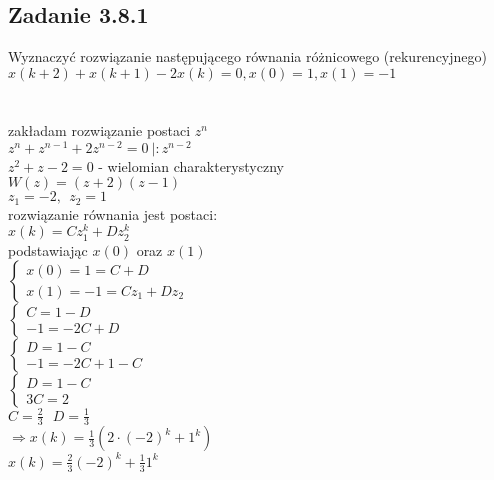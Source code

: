 \subsection*{Zadanie 3.8.1} {\color{darkgray}
	Wyznaczyć rozwiązanie następującego równania różnicowego (rekurencyjnego)\\
	$x(k+2)+x(k+1)-2x(k)=0, x(0)=1,x(1)=-1$\\
}\lineh
\\\\
zakładam rozwiązanie postaci $z^n$\\
$z^n+z^{n-1}+2z^{n-2}=0 \ |:z^{n-2}$\\
$z^2+z-2=0$ - wielomian charakterystyczny\\
$W(z)=(z+2)(z-1)$\\
$z_1=-2, \ \ z_2=1$\\
rozwiązanie równania jest postaci:\\
$x(k)=Cz_1^k+Dz_2^k$\\
podstawiając $x(0)$ oraz $x(1)$\\
$\begin{cases} 
	x(0)=1=C+D \\
	x(1)=-1=Cz_1+Dz_2
\end{cases}$\\
$\begin{cases}
	 C=1-D \\
	-1=-2C+D
\end{cases}$\\
$\begin{cases}
	 D=1-C\\
	-1=-2C+1-C
\end{cases}$\\
$\begin{cases}
	 D=1-C\\
	3C=2
\end{cases}$\\
$C=\frac{2}{3} \ \ \ D=\frac{1}{3}$\\
$\Rightarrow x(k)=\frac{1}{3}(2 \cdot(-2)^k+1^k)$\\
$\boxed{x(k)=\frac{2}{3}(-2)^k+\frac{1}{3}1^k}$

\pagebreak
